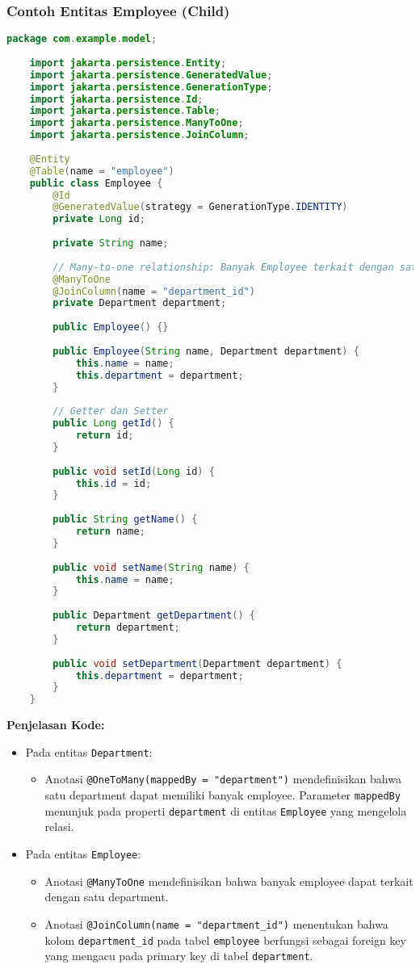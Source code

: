 \subsubsection*{Contoh Entitas Employee (Child)}
\begin{lstlisting}[language=Java, style=JavaStyle]
	package com.example.model;
	
	import jakarta.persistence.Entity;
	import jakarta.persistence.GeneratedValue;
	import jakarta.persistence.GenerationType;
	import jakarta.persistence.Id;
	import jakarta.persistence.Table;
	import jakarta.persistence.ManyToOne;
	import jakarta.persistence.JoinColumn;
	
	@Entity
	@Table(name = "employee")
	public class Employee {
		@Id
		@GeneratedValue(strategy = GenerationType.IDENTITY)
		private Long id;
		
		private String name;
		
		// Many-to-one relationship: Banyak Employee terkait dengan satu Department
		@ManyToOne
		@JoinColumn(name = "department_id")
		private Department department;
		
		public Employee() {}
		
		public Employee(String name, Department department) {
			this.name = name;
			this.department = department;
		}
		
		// Getter dan Setter
		public Long getId() {
			return id;
		}
		
		public void setId(Long id) {
			this.id = id;
		}
		
		public String getName() {
			return name;
		}
		
		public void setName(String name) {
			this.name = name;
		}
		
		public Department getDepartment() {
			return department;
		}
		
		public void setDepartment(Department department) {
			this.department = department;
		}
	}
\end{lstlisting}

\textbf{Penjelasan Kode:}
\begin{itemize}
	\item Pada entitas \texttt{Department}:
	\begin{itemize}
		\item Anotasi \texttt{@OneToMany(mappedBy = "department")} mendefinisikan bahwa satu department dapat memiliki banyak employee. Parameter \texttt{mappedBy} menunjuk pada properti \texttt{department} di entitas \texttt{Employee} yang mengelola relasi.
	\end{itemize}
	\item Pada entitas \texttt{Employee}:
	\begin{itemize}
		\item Anotasi \texttt{@ManyToOne} mendefinisikan bahwa banyak employee dapat terkait dengan satu department.
		\item Anotasi \texttt{@JoinColumn(name = "department\_id")} menentukan bahwa kolom \texttt{department\_id} pada tabel \texttt{employee} berfungsi sebagai foreign key yang mengacu pada primary key di tabel \texttt{department}.
	\end{itemize}
\end{itemize}

